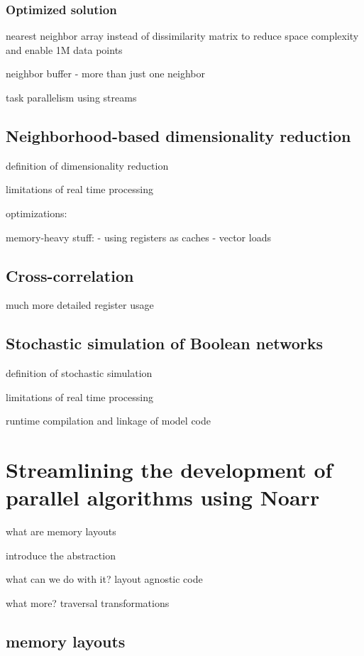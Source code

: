\documentclass[12pt,a4paper]{report}
\begin{document}
\subsection{Optimized solution}

nearest neighbor array instead of dissimilarity matrix to reduce space complexity and enable 1M data points

neighbor buffer - more than just one neighbor

task parallelism using streams



\section{Neighborhood-based dimensionality reduction}

definition of dimensionality reduction

limitations of real time processing


optimizations:

memory-heavy stuff:
- using registers as caches
- vector loads

\section{Cross-correlation}

much more detailed register usage 

\section{Stochastic simulation of Boolean networks}

definition of stochastic simulation

limitations of real time processing

runtime compilation and linkage of model code

\chapter{Streamlining the development of parallel algorithms using Noarr}

what are memory layouts 

introduce the abstraction

what can we do with it? layout agnostic code

what more? traversal transformations

\section{memory layouts}
\end{document}
